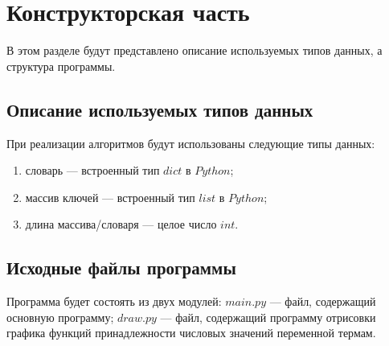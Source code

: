 \chapter{Конструкторская часть}
В этом разделе будут представлено описание используемых типов данных,
а структура программы.

\section{Описание используемых типов данных}
При реализации алгоритмов будут использованы следующие типы данных:
\begin{enumerate}[label=\arabic*)]
	\item словарь --- встроенный тип $dict$ \cite{pythondict} в $Python$;
	\item массив ключей --- встроенный тип $list$ в $Python$;
	\item длина массива/словаря --- целое число $int$.
\end{enumerate}

\section{Исходные файлы программы}

Программа будет состоять из двух модулей: $main.py$ --- файл, содержащий основную программу; $draw.py$ --- файл, содержащий программу отрисовки графика функций принадлежности числовых значений переменной термам.

